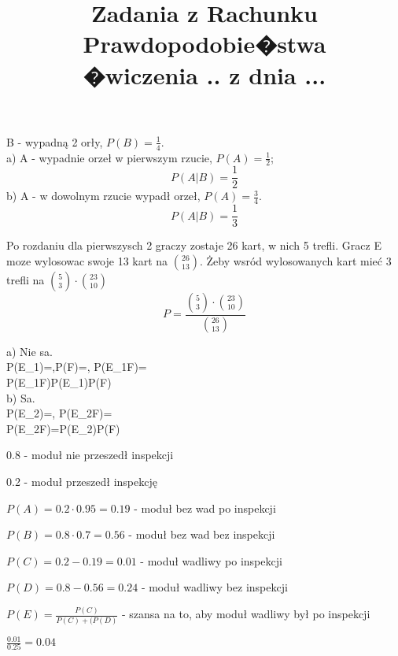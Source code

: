 \documentclass[fleqn]{article}
\begin{document}
\title{Zadania z Rachunku Prawdopodobie�stwa \\ �wiczenia .. z dnia ...}
\date{}
\medskip


B - wypadną 2 orły, $P(B) = \frac{1}{4}$. \\
a) A - wypadnie orzeł w pierwszym rzucie, $P(A) = \frac{1}{2}$; \\
   \[P(A|B) = \frac{1}{2}\]
b) A - w dowolnym rzucie wypadł orzeł, $P(A) = \frac{3}{4}$. \\
   \[P(A|B) =\frac{1}{3}\]

\medskip

\medskip

Po rozdaniu dla pierwszysch 2 graczy zostaje 26 kart, w nich 5 trefli. Gracz E moze wylosowac swoje 13 kart na ${26 \choose 13}$. Żeby wsród wylosowanych kart mieć 3 trefli na ${5 \choose 3}\cdot{23 \choose 10}$\\
\[P = \frac{{5 \choose 3}\cdot{23 \choose 10}}{{26 \choose 13}}\]

\medskip

\medskip

a) Nie sa.\\
P(E_{1})=,P(F)=, P(E_{1}\cap F)=\\ P(E_{1}\cap F)\neq P(E_{1})P(F)\\
b) Sa.\\
P(E_{2})=, P(E_{2}\cap F)=\\
P(E_{2}\cap F)=P(E_{2})P(F)\\

\medskip
{}
\medskip

0.8 - moduł nie przeszedł inspekcji

0.2 - moduł przeszedł inspekcję

$P(A) = 0.2 \cdot 0.95 = 0.19$ - moduł bez wad po inspekcji

$P(B) = 0.8 \cdot 0.7 = 0.56$ - moduł bez wad bez inspekcji

$P(C) = 0.2 - 0.19 = 0.01$ - moduł wadliwy po inspekcji

$P(D) = 0.8 - 0.56 = 0.24$ - moduł wadliwy bez inspekcji

$P(E) = \frac{P(C)}{P(C)+(P(D)}$ - szansa na to, aby moduł wadliwy był po inspekcji

$\frac{0.01}{0.25} = 0.04$

\medskip
{}
\medskip
\end{document}
